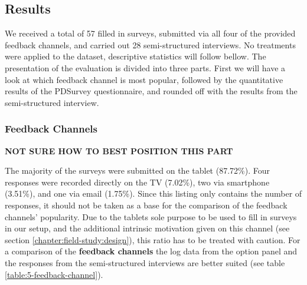 


\clearpage
\subsection{Results}





	We received a total of 57 filled in surveys, submitted via all four of the provided feedback channels, and carried out 28 semi-structured interviews. 
	No treatments were applied to the dataset, descriptive statistics will follow bellow. The presentation of the evaluation is divided into three parts. First we will have a look at which feedback channel is most popular, followed by the quantitative results of the PDSurvey questionnaire, and rounded off with the results from the semi-structured interview. 



	\subsubsection{Feedback Channels}
	\label{5:results:feedback-channels}
	\label{5:results:feedback-channel}

	\textbf{NOT SURE HOW TO BEST POSITION THIS PART}

	The majority of the surveys were submitted on the tablet (87.72\%). Four responses were recorded directly on the TV (7.02\%), two via smartphone (3.51\%), and one via email (1.75\%). Since this listing only contains the number of responses, it should not be taken as a base for the comparison of the feedback channels' popularity. %
	Due to the tablets sole purpose to be used to fill in surveys in our setup, and the additional intrinsic motivation given on this channel (see section \ref{chapter:field-study:design}), this ratio has to be treated with caution. For a comparison of the \textbf{feedback channels} the log data from the option panel and the responses from the semi-structured interviews are better suited (see table \ref{table:5-feedback-channel}).


